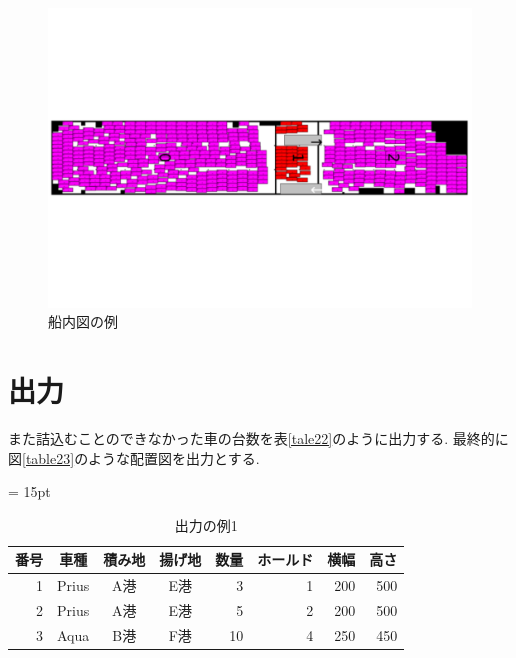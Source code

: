 \begin{figure}[htbt]
    \includegraphics{illustration/ship.pdf}
    \caption{船内図の例}
    \label{figure22}
\end{figure}

\section{出力}
また詰込むことのできなかった車の台数を表\ref{tale22}のように出力する. 
最終的に図\ref{table23}のような配置図を出力とする. 

\begin{table}[htbp]
    \tabcolsep = 15pt
    \renewcommand{\arraystretch}{0.8}
    \caption{出力の例1}
    \label{table22}
    \begin{center}
    \begin{tabular}{rcccrrrr} \hline
    番号 & 車種 & 積み地 & 揚げ地 & 数量 & ホールド & 横幅 & 高さ \\ \hline
    1 & Prius & A港 & E港 & 3 & 1 & 200 & 500 \\
    2 & Prius & A港 & E港 & 5 & 2 & 200 & 500 \\
    3 & Aqua & B港 & F港 & 10 & 4 & 250 & 450 \\
    \hline
    \end{tabular}
    \end{center}
    \end{table}
